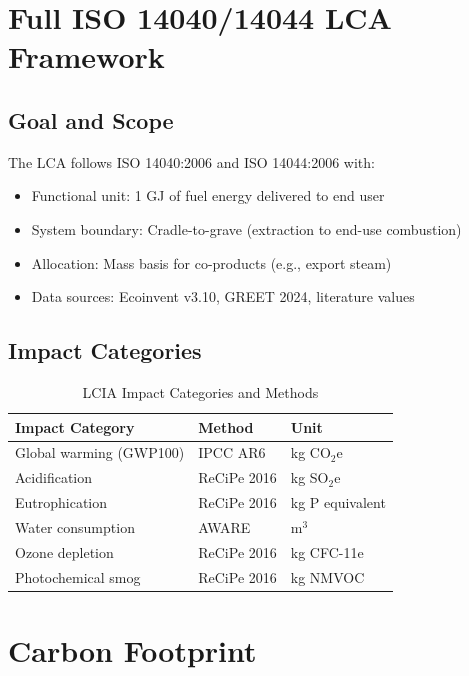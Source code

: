 \documentclass[12pt,twoside,openany]{book}
\begin{document}
\section{Full ISO 14040/14044 LCA Framework}

\subsection{Goal and Scope}

The LCA follows ISO 14040:2006 and ISO 14044:2006 with:
\begin{itemize}
    \item Functional unit: 1 GJ of fuel energy delivered to end user
    \item System boundary: Cradle-to-grave (extraction to end-use combustion)
    \item Allocation: Mass basis for co-products (e.g., export steam)
    \item Data sources: Ecoinvent v3.10, GREET 2024, literature values
\end{itemize}

\subsection{Impact Categories}

\begin{table}[htbp]
    \centering
    \caption{LCIA Impact Categories and Methods}
    \label{tab:lcia_methods}
    \begin{tabular}{L{5cm} C{3cm} C{3cm}}
    \hline
    \textbf{Impact Category} & \textbf{Method} & \textbf{Unit} \\
    \hline
    Global warming (GWP100) & IPCC AR6 & kg CO$_2$e \\
    Acidification           & ReCiPe 2016 & kg SO$_2$e \\
    Eutrophication          & ReCiPe 2016 & kg P equivalent \\
    Water consumption       & AWARE & m$^3$ \\
    Ozone depletion         & ReCiPe 2016 & kg CFC-11e \\
    Photochemical smog      & ReCiPe 2016 & kg NMVOC \\
    \hline
    \end{tabular}
\end{table}

\section{Carbon Footprint}
\end{document}
